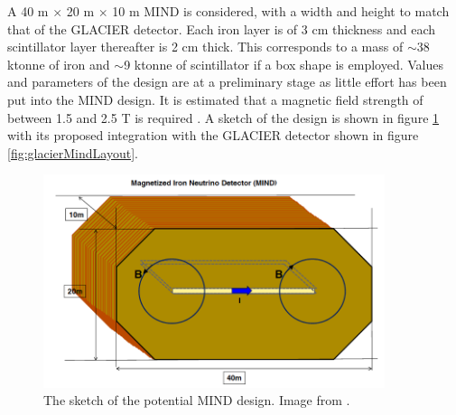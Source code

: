 A 40 m $\times$ 20 m $\times$ 10 m MIND is considered, with a width and height to match that of the GLACIER detector. Each iron layer is of 3 cm thickness and each scintillator layer thereafter is 2 cm thick. This corresponds to a mass of $\sim$38 ktonne of iron and $\sim$9 ktonne of scintillator if a box shape is employed. Values and parameters of the design are at a preliminary stage as little effort has been put into the MIND design. It is estimated that a magnetic field strength of between 1.5 and 2.5 T is required \cite{lbnoInternal}. A sketch of the design is shown in figure \ref{fig:mindFD} with its proposed integration with the GLACIER detector shown in figure \ref{fig:glacierMindLayout}.

\begin{figure}[htbp]
\begin{center}
\includegraphics[width=100mm]{Chapter2/figures/mindFDdesign.png}
\caption{The sketch of the potential MIND design. Image from \cite{lbnoInternal}.}
\label{fig:mindFD}
\end{center}
\end{figure}

